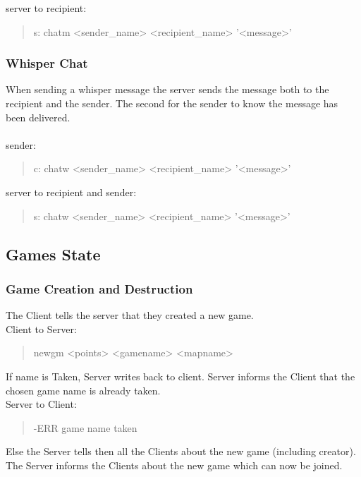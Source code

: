 \documentclass[a4paper,11pt]{article}
\begin{document}
\noindent
server to recipient:
\begin{quote}
  s: chatm <sender\_name> <recipient\_name> '<message>'\\ %
\end{quote}


\subsubsection{Whisper Chat}
When sending a whisper message the server sends the message both to the recipient and the sender. The second for the sender to know the message has been delivered.\\\\

\noindent
sender:
\begin{quote}
  c: chatw <sender\_name> <recipient\_name> '<message>'\\
\end{quote}

\noindent
server to recipient and sender:
\begin{quote}
  s: chatw <sender\_name> <recipient\_name> '<message>'\\
\end{quote}
\clearpage
\subsection{Games State}

\subsubsection{Game Creation and Destruction}
The Client tells the server that they created a new game.\\
Client to Server:
\begin{quote}
  newgm <points> <gamename> <mapname>
\end{quote}

\noindent
If name is Taken, Server writes back to client. Server informs the Client that the chosen game name is already taken.\\
Server to Client:
\begin{quote}
  -ERR game name taken
\end{quote}

\noindent
Else the Server tells then all the Clients about the new game (including creator). The Server informs the Clients about the new game which can now be joined.\\\\
\end{document}
